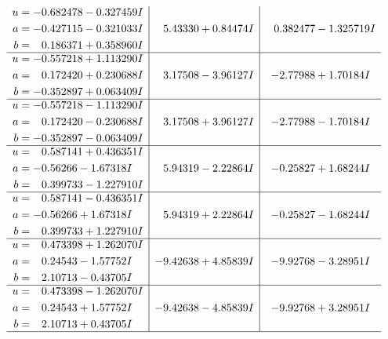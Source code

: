 \documentclass[1p]{elsarticle_modified}
\theoremstyle{definition}
\begin{document}
$$\begin{array}{c|c|c}
\begin{aligned}
u &= -0.682478 - 0.327459 I \\
a &= -0.427115 - 0.321033 I \\
b &= \phantom{-}0.186371 + 0.358960 I\end{aligned}
 & \phantom{-}5.43330 + 0.84474 I & \phantom{-}0.382477 - 1.325719 I \\ \hline\begin{aligned}
u &= -0.557218 + 1.113290 I \\
a &= \phantom{-}0.172420 + 0.230688 I \\
b &= -0.352897 + 0.063409 I\end{aligned}
 & \phantom{-}3.17508 - 3.96127 I & -2.77988 + 1.70184 I \\ \hline\begin{aligned}
u &= -0.557218 - 1.113290 I \\
a &= \phantom{-}0.172420 - 0.230688 I \\
b &= -0.352897 - 0.063409 I\end{aligned}
 & \phantom{-}3.17508 + 3.96127 I & -2.77988 - 1.70184 I \\ \hline\begin{aligned}
u &= \phantom{-}0.587141 + 0.436351 I \\
a &= -0.56266 - 1.67318 I \\
b &= \phantom{-}0.399733 - 1.227910 I\end{aligned}
 & \phantom{-}5.94319 - 2.22864 I & -0.25827 + 1.68244 I \\ \hline\begin{aligned}
u &= \phantom{-}0.587141 - 0.436351 I \\
a &= -0.56266 + 1.67318 I \\
b &= \phantom{-}0.399733 + 1.227910 I\end{aligned}
 & \phantom{-}5.94319 + 2.22864 I & -0.25827 - 1.68244 I \\ \hline\begin{aligned}
u &= \phantom{-}0.473398 + 1.262070 I \\
a &= \phantom{-}0.24543 - 1.57752 I \\
b &= \phantom{-}2.10713 - 0.43705 I\end{aligned}
 & -9.42638 + 4.85839 I & -9.92768 - 3.28951 I \\ \hline\begin{aligned}
u &= \phantom{-}0.473398 - 1.262070 I \\
a &= \phantom{-}0.24543 + 1.57752 I \\
b &= \phantom{-}2.10713 + 0.43705 I\end{aligned}
 & -9.42638 - 4.85839 I & -9.92768 + 3.28951 I\\
 \hline 
 \end{array}$$\newpage
\end{document}
